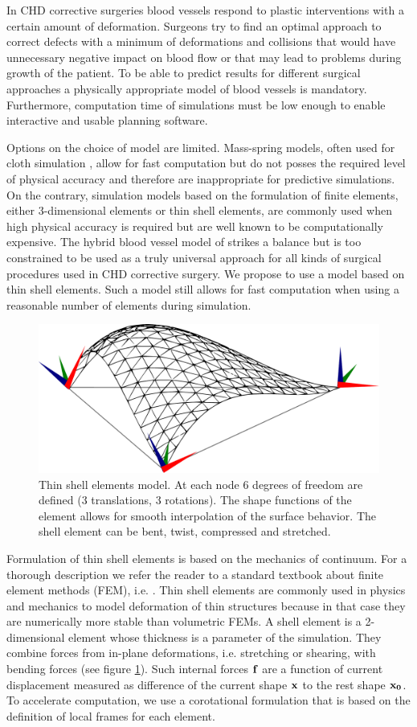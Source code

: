 In CHD corrective surgeries blood vessels respond to plastic interventions with a certain amount of deformation. Surgeons try to find an optimal approach to correct defects with a minimum of deformations and collisions that would have unnecessary negative impact on blood flow or that may lead to problems during growth of the patient. To be able to predict results for different surgical approaches a physically appropriate model of blood vessels is mandatory. Furthermore, computation time of simulations must be low enough to enable interactive and usable planning software.

Options on the choice of model are limited. Mass-spring models, often used for cloth simulation \cite{Volino2005b}, allow for fast computation but do not posses the required level of physical accuracy and therefore are inappropriate for predictive simulations. On the contrary, simulation models based on the formulation of finite elements, either 3-dimensional elements or thin shell elements, are commonly used when high physical accuracy is required but are well known to be computationally expensive. The hybrid blood vessel model of \cite{Li2009} strikes a balance but is too constrained to be used as a truly universal approach for all kinds of surgical procedures used in CHD corrective surgery. We propose to use a model based on thin shell elements. Such a model still allows for fast computation when using a reasonable number of elements during simulation.

\begin{figure}[tbh]
  \centering
  \includegraphics[width=0.4\columnwidth]{img/shell.pdf}
  \caption{Thin shell elements model. At each node 6 degrees of freedom are defined (3 translations, 3 rotations). The shape functions of the element allows for smooth interpolation of the surface behavior. The shell element can be bent, twist, compressed and stretched.}
  \label{fig-shell}
\end{figure}

Formulation of thin shell elements is based on the mechanics of continuum. For a thorough description we refer the reader to a standard textbook about finite element methods (FEM), i.e. \cite{Reddy1993}. Thin shell elements are commonly used in physics and mechanics to model deformation of thin structures because in that case they are numerically more stable than volumetric FEMs. A shell element is a 2-dimensional element whose thickness is a parameter of the simulation. They combine forces from in-plane deformations, i.e. stretching or shearing, with bending forces (see figure \ref{fig-shell}). Such internal forces $\mathbf{f}$ are a function of current displacement measured as difference of the current shape $\mathbf{x}$ to the rest shape $\mathbf{x_0}$. To accelerate computation, we use a corotational formulation that is based on the definition of local frames for each element.

